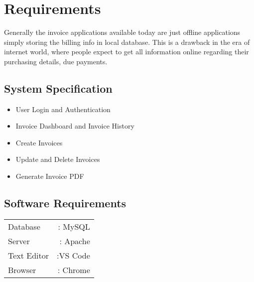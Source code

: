 \chapter{Requirements}

Generally the invoice applications available today are just offline applications simply storing the billing info in local database. This is a drawback in the era of internet world, where people expect to get all information online regarding their purchasing details, due payments.

\section{System Specification}
\begin{itemize}
\item User Login and Authentication
\item Invoice Dashboard and Invoice History
\item Create Invoices
\item Update and Delete Invoices
\item Generate Invoice PDF
\end{itemize}

\section{Software Requirements}
\begin{center}
\begin{tabular}{lr}
Database & : MySQL\\
Server & : Apache\\
Text Editor & :VS Code\\
Browser & : Chrome\\
\end{tabular}
\end{center}
